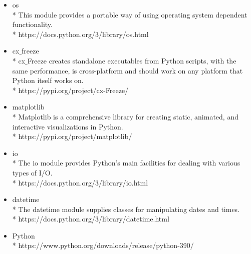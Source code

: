 \begin{itemize}
	\item os
		\\* This module provides a portable way of using operating system dependent functionality.
		\\* https://docs.python.org/3/library/os.html
	\item cx$\_$freeze
		\\* cx$\_$Freeze creates standalone executables from Python scripts, with the same performance, is cross-platform and should work on any platform that Python itself works on.
		\\* https://pypi.org/project/cx-Freeze/
	\item matplotlib
		\\* Matplotlib is a comprehensive library for creating static, animated, and interactive visualizations in Python.
		\\* https://pypi.org/project/matplotlib/
	\item io
		\\* The io module provides Python’s main facilities for dealing with various types of I/O.
		\\* https://docs.python.org/3/library/io.html
	\item datetime
		\\* The datetime module supplies classes for manipulating dates and times.
		\\* https://docs.python.org/3/library/datetime.html
	\item Python
		\\* https://www.python.org/downloads/release/python-390/
\end{itemize}